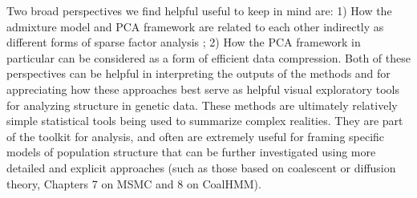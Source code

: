 \documentclass{svmult}       %
\begin{document}
Two broad perspectives we find helpful useful to keep in mind are: 1)
How the admixture model and PCA framework are related to each other
indirectly as different forms of sparse factor analysis \cite{Engelhardt10}; 2) How the PCA framework in particular can be considered
as a form of efficient data compression. Both of these perspectives can
be helpful in interpreting the outputs of the methods and for
appreciating how these approaches best serve as helpful visual
exploratory tools for analyzing structure in genetic data. These methods
are ultimately relatively simple statistical tools being used to
summarize complex realities. They are part of the toolkit for analysis,
and often are extremely useful for framing specific models of population
structure that can be further investigated using more detailed and
explicit approaches (such as those based on coalescent or diffusion
theory, Chapters 7 on MSMC and 8 on CoalHMM).



\end{document}

